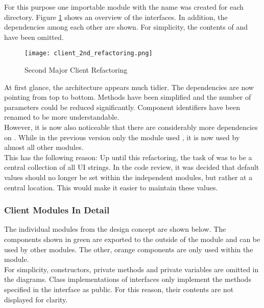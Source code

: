 For this purpose one importable module with the name  was created for each directory.
Figure \ref{fig:client_2nd_refactoring} shows an overview of the interfaces.
In addition, the dependencies among each other are shown.
For simplicity, the contents of  and  have been omitted. \\

\begin{figure}[H]
    \centering
    \texttt{[image: client\_2nd\_refactoring.png]}
    \caption{Second Major Client Refactoring}
    \label{fig:client_2nd_refactoring}
\end{figure}

At first glance, the architecture appears much tidier.
The dependencies are now pointing from top to bottom.
Methods have been simplified and the number of parameters could be reduced significantly.
Component identifiers have been renamed to be more understandable. \\

However, it is now also noticeable that there are considerably more dependencies on .
While in the previous version only the module  used , it is now used by almost all other modules.\\

This has the following reason: Up until this refactoring, the task of  was to be a central collection of all UI strings.  
In the code review, it was decided that default values should no longer be set within the independent modules,
but rather at a central location.
This would make it easier to maintain these values.

\subsubsection{Client Modules In Detail}
The individual modules from the design concept are shown below.
The components shown in green are exported to the outside of the module and can be used by other modules.
The other, orange components are only used within the module. \\

For simplicity, constructors, private methods and private variables are omitted in the diagrams.
Class implementations of interfaces only implement the methods specified in the interface as public.
For this reason, their contents are not displayed for clarity. \\

